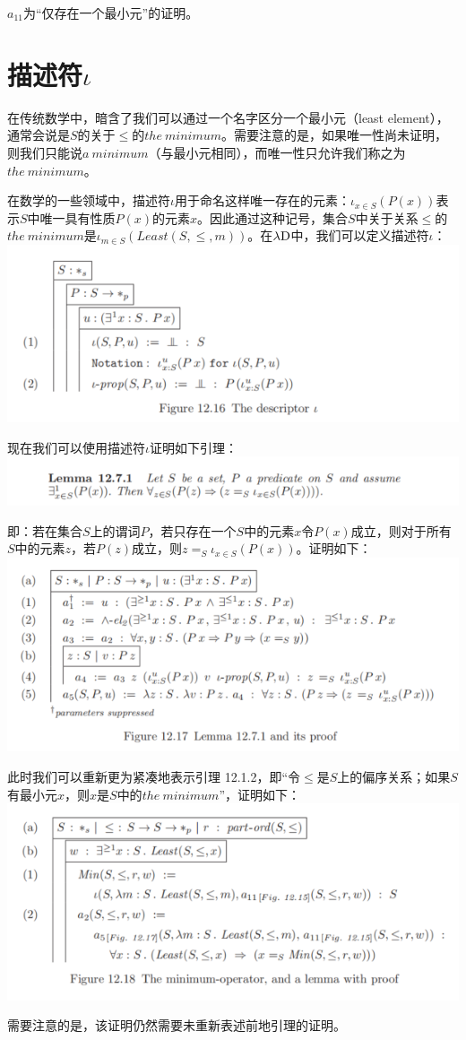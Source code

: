 \documentclass[UTF8]{article}
\begin{document}
		$a_{11}$为“仅存在一个最小元”的证明。
	
	\section{描述符$\iota$}
	\noindent
	在传统数学中，暗含了我们可以通过一个名字区分一个最小元（least element），通常会说是$S$的关于$\le$的$the\ minimum$。需要注意的是，如果唯一性尚未证明，则我们只能说$a\ minimum$（与最小元相同），而唯一性只允许我们称之为$the\ minimum$。
	
		在数学的一些领域中，描述符$\iota$用于命名这样唯一存在的元素：$\iota_{x\in S}(P(x))$表示$S$中唯一具有性质$P(x)$的元素$x$。因此通过这种记号，集合$S$中关于关系$\le$的$the\ minimum$是$\iota_{m\in S}(Least(S,\le,m))$。在$\lambda{\rm D}$中，我们可以定义描述符$\iota$：\\
		\includegraphics[width=0.93\linewidth]{"../imgs/12-14.png"}
		
		现在我们可以使用描述符$\iota$证明如下引理：\\
		\includegraphics[width=0.93\linewidth]{"../imgs/12-15.png"}
		
		即：若在集合$S$上的谓词$P$，若只存在一个$S$中的元素$x$令$P(x)$成立，则对于所有$S$中的元素$z$，若$P(z)$成立，则$z=_S \iota_{x\in S}(P(x))$。证明如下：\\
		\includegraphics[width=0.93\linewidth]{"../imgs/12-16.png"}
		
		此时我们可以重新更为紧凑地表示引理 12.1.2，即“令$\le$是$S$上的偏序关系；如果$S$有最小元$x$，则$x$是$S$中的$the\ minimum$”，证明如下：\\
		\includegraphics[width=0.93\linewidth]{"../imgs/12-17.png"}
		
		需要注意的是，该证明仍然需要未重新表述前地引理的证明。
\end{document}
